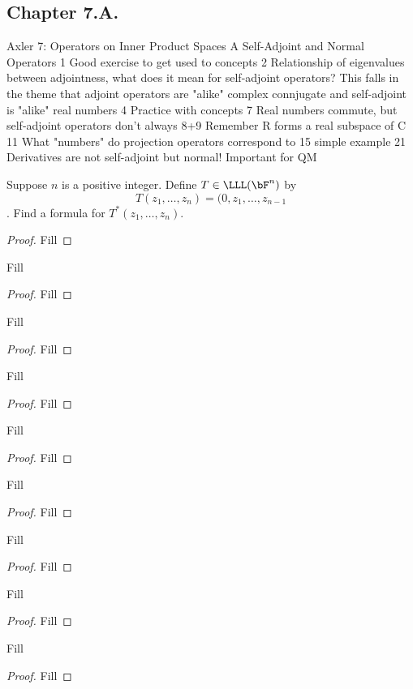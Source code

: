 \subsection*{Chapter 7.A. }

Axler 7: Operators on Inner Product Spaces
A Self-Adjoint and Normal Operators
1 Good exercise to get used to concepts
2 Relationship of eigenvalues between adjointness, what does it mean for self-adjoint operators? This falls in the theme that adjoint operators are "alike" complex connjugate and self-adjoint is "alike" real numbers
4 Practice with concepts 
7 Real numbers commute, but self-adjoint operators don't always
8+9 Remember R forms a real subspace of C
11 What "numbers" do projection operators correspond to
15 simple example
21 Derivatives are not self-adjoint but normal! Important for QM

\begin{exercise}{1}
  Suppose $n$ is a positive integer. Define $T\in\LLL(\bF^n)$ by 
  \[T(z_1,\dots,z_n)=(0,z_1,\dots,z_{n-1}\].
  Find a formula for $T^\ast(z_1,\dots,z_n)$.
\end{exercise}
\begin{proof}
 Fill
\end{proof}

\begin{exercise}{1}
  Fill
\end{exercise}
\begin{proof}
 Fill
\end{proof}

\begin{exercise}{1}
  Fill
\end{exercise}
\begin{proof}
 Fill
\end{proof}

\begin{exercise}{1}
  Fill
\end{exercise}
\begin{proof}
 Fill
\end{proof}

\begin{exercise}{1}
  Fill
\end{exercise}
\begin{proof}
 Fill
\end{proof}

\begin{exercise}{1}
  Fill
\end{exercise}
\begin{proof}
 Fill
\end{proof}

\begin{exercise}{1}
  Fill
\end{exercise}
\begin{proof}
 Fill
\end{proof}

\begin{exercise}{1}
  Fill
\end{exercise}
\begin{proof}
 Fill
\end{proof}

\begin{exercise}{1}
  Fill
\end{exercise}
\begin{proof}
 Fill
\end{proof}
